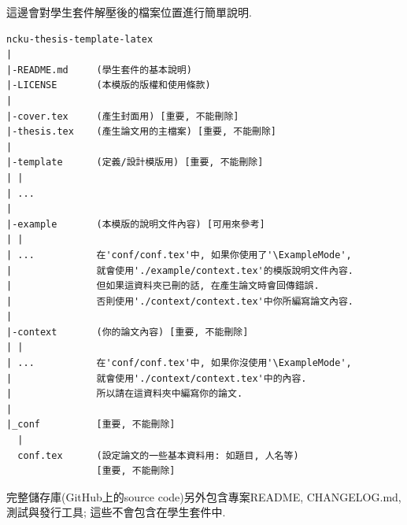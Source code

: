 
這邊會對學生套件解壓後的檔案位置進行簡單說明.\\

\begin{DescriptionFrame}
\begin{verbatim}
ncku-thesis-template-latex
|
|-README.md     (學生套件的基本說明)
|-LICENSE       (本模版的版權和使用條款)
|
|-cover.tex     (產生封面用) [重要, 不能刪除]
|-thesis.tex    (產生論文用的主檔案) [重要, 不能刪除]
|
|-template      (定義/設計模版用) [重要, 不能刪除]
| |
| ...
|
|-example       (本模版的說明文件內容) [可用來參考]
| |
| ...           在'conf/conf.tex'中, 如果你使用了'\ExampleMode',
|               就會使用'./example/context.tex'的模版說明文件內容.
|               但如果這資料夾已刪的話, 在產生論文時會回傳錯誤.
|               否則使用'./context/context.tex'中你所編寫論文內容.
|
|-context       (你的論文內容) [重要, 不能刪除]
| |
| ...           在'conf/conf.tex'中, 如果你沒使用'\ExampleMode',
|               就會使用'./context/context.tex'中的內容.
|               所以請在這資料夾中編寫你的論文.
|
|_conf          [重要, 不能刪除]
  |
  conf.tex      (設定論文的一些基本資料用: 如題目, 人名等)
                [重要, 不能刪除]
\end{verbatim}
\end{DescriptionFrame}

完整儲存庫(GitHub上的source code)另外包含專案README, CHANGELOG.md, 測試與發行工具; 這些不會包含在學生套件中.
